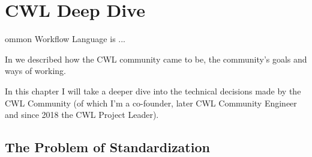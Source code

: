 \chapter{CWL Deep Dive}
\label{cwl-deep-dive}


ommon Workflow Language is ...

In \cite{crusoe-methods-2022} we described how the CWL community came to be, the community's goals and ways of working.

In this chapter I will take a deeper dive into the technical decisions made by the CWL Community (of which I'm a co-founder, later CWL Community Engineer and since 2018 the CWL Project Leader).





% 
% 
% 

\section{The Problem of Standardization}

